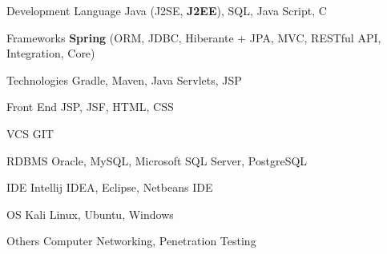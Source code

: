 

\begin{cvskills}
	\cvskill
	{Development Language}
	{Java (J2SE, \textbf{J2EE}), SQL, Java Script, C}
	
	\cvskill
	{Frameworks}
	{\textbf{Spring} (ORM, JDBC, Hiberante + JPA, MVC, RESTful API, Integration, Core)}
	
	\cvskill
	{Technologies}
	{Gradle, Maven, Java Servlets, JSP}
	
	\cvskill
	{Front End}
	{JSP, JSF, HTML, CSS}
	
	\cvskill
	{VCS}
	{GIT}
	
	\cvskill
	{RDBMS}
	{Oracle, MySQL, Microsoft SQL Server, PostgreSQL}
	
	\cvskill
	{IDE}
	{Intellij IDEA, Eclipse, Netbeans IDE}
	
	\cvskill
	{OS}
	{Kali Linux, Ubuntu, Windows}
	
	\cvskill
	{Others}
	{Computer Networking, Penetration Testing}
	
\end{cvskills}